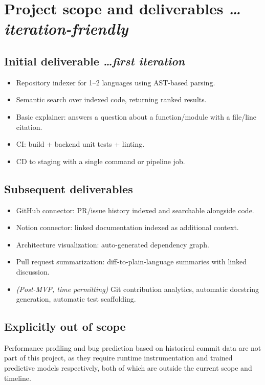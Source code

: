 \documentclass[11pt,a4paper]{article}
\newcommand{\BvrHint}[1]{%
  {\normalfont\normalsize\itshape\hfill #1}}
\begin{document}
\section{Project scope and deliverables %
\BvrHint{\ldots iteration-friendly}}
\subsection{Initial deliverable %
\BvrHint{\ldots first iteration}}
\begin{itemize}[leftmargin=0.7cm]
    \item Repository indexer for 1--2 languages using AST-based parsing.
    \item Semantic search over indexed code, returning ranked results.
    \item Basic explainer: answers a question about a function/module with a file/line citation.
    \item CI: build + backend unit tests + linting.
    \item CD to staging with a single command or pipeline job.
\end{itemize}

\subsection{Subsequent deliverables}
\begin{itemize}[leftmargin=0.7cm]
    \item GitHub connector: PR/issue history indexed and searchable alongside code.
    \item Notion connector: linked documentation indexed as additional context.
    \item Architecture visualization: auto-generated dependency graph.
    \item Pull request summarization: diff-to-plain-language summaries with linked discussion.
    \item \emph{(Post-MVP, time permitting)} Git contribution analytics, automatic docstring generation, automatic test scaffolding.
\end{itemize}

\subsection{Explicitly out of scope}
Performance profiling and bug prediction based on
historical commit data are not part of this project, as
they require runtime instrumentation and trained
predictive models respectively, both of which are
outside the current scope and timeline.
\end{document}
